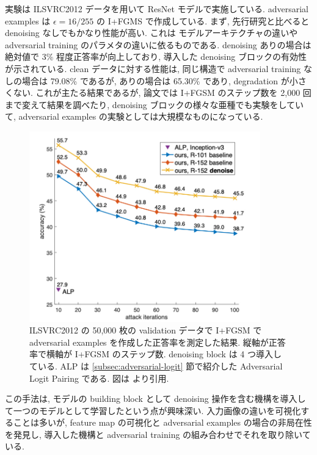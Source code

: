 実験は ILSVRC2012 データを用いて ResNet モデルで実施している.
adversarial examples は $\epsilon = 16 / 255$ の I+FGMS で作成している.
まず, 先行研究と比べると denoising なしでもかなり性能が高い.
これは モデルアーキテクチャの違いや adversarial training のパラメタの違いに依るものである.
denoising ありの場合は絶対値で 3\% 程度正答率が向上しており, 導入した denoising ブロックの有効性が示されている.
clean データに対する性能は, 同じ構造で adversarial training なしの場合は 79.08\% であるが, ありの場合は 65.30\% であり, degradation が小さくない.
これが主たる結果であるが, 論文では I+FGSM のステップ数を 2,000 回まで変えて結果を調べたり, denoising ブロックの様々な亜種でも実験をしていて, adversarial examples の実験としては大規模なものになっている.
%
\begin{figure}[htbp]
\begin{center}
\includegraphics[width=10.0cm]{figures/feature-denoising-result-graph.pdf}
\end{center}
\caption{
ILSVRC2012 の 50,000 枚の validation データで I+FGSM で adversarial examples を作成した正答率を測定した結果.
縦軸が正答率で横軸が I+FGSM のステップ数.
denoising block は 4 つ導入している.
ALP は \ref{subsec:adversarial-logit} 節で紹介した Adversarial Logit Pairing である.
図は \cite{xie2019feature} より引用.
}
\label{fig:feature-denoising-result-graph}
\end{figure}
%

この手法は, モデルの building block として denoising 操作を含む機構を導入して一つのモデルとして学習したという点が興味深い.
入力画像の違いを可視化することは多いが, feature map の可視化と adversarial examples の場合の非局在性を発見し, 導入した機構と adversarial training の組み合わせでそれを取り除いている.



